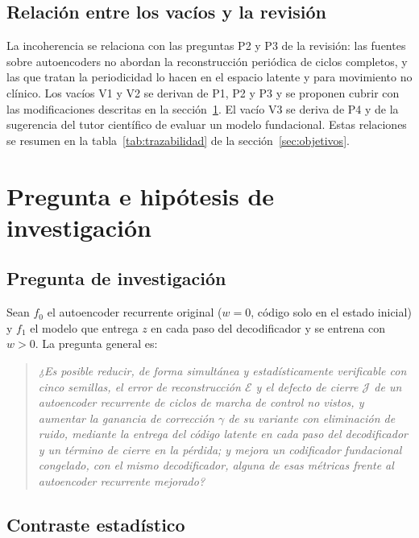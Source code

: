 \documentclass[11pt,a4paper]{article}
\begin{document}
\subsection{Relación entre los vacíos y la revisión}

La incoherencia se relaciona con las preguntas P2 y P3 de la revisión: las fuentes sobre autoencoders no abordan la reconstrucción periódica de ciclos completos, y las que tratan la periodicidad lo hacen en el espacio latente y para movimiento no clínico. Los vacíos V1 y V2 se derivan de P1, P2 y P3 y se proponen cubrir con las modificaciones descritas en la sección~\ref{sec:pregunta}. El vacío V3 se deriva de P4 y de la sugerencia del tutor científico de evaluar un modelo fundacional. Estas relaciones se resumen en la tabla~\ref{tab:trazabilidad} de la sección~\ref{sec:objetivos}.

\section{Pregunta e hipótesis de investigación}
\label{sec:pregunta}

\subsection{Pregunta de investigación}

Sean $f_0$ el autoencoder recurrente original ($w=0$, código solo en el estado inicial) y $f_1$ el modelo que entrega $z$ en cada paso del decodificador y se entrena con $w>0$. La pregunta general es:

\begin{quote}
\textit{¿Es posible reducir, de forma simultánea y estadísticamente verificable con cinco semillas, el error de reconstrucción $\mathcal E$ y el defecto de cierre $\mathcal J$ de un autoencoder recurrente de ciclos de marcha de control no vistos, y aumentar la ganancia de corrección $\gamma$ de su variante con eliminación de ruido, mediante la entrega del código latente en cada paso del decodificador y un término de cierre en la pérdida; y mejora un codificador fundacional congelado, con el mismo decodificador, alguna de esas métricas frente al autoencoder recurrente mejorado?}
\end{quote}

\subsection{Contraste estadístico}
\end{document}
